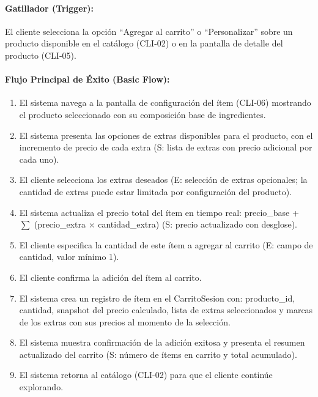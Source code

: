 \paragraph{Gatillador (Trigger):} El cliente selecciona la opción ``Agregar al carrito'' o ``Personalizar'' sobre un producto disponible en el catálogo (CLI-02) o en la pantalla de detalle del producto (CLI-05).

\paragraph{Flujo Principal de Éxito (Basic Flow):}
\begin{enumerate}
    \item[I.] El sistema navega a la pantalla de configuración del ítem (CLI-06) mostrando el producto seleccionado con su composición base de ingredientes.
    \item[II.] El sistema presenta las opciones de extras disponibles para el producto, con el incremento de precio de cada extra (S: lista de extras con precio adicional por cada uno).
    \item[III.] El cliente selecciona los extras deseados (E: selección de extras opcionales; la cantidad de extras puede estar limitada por configuración del producto).
    \item[IV.] El sistema actualiza el precio total del ítem en tiempo real: precio\_base + $\sum$ (precio\_extra $\times$ cantidad\_extra) (S: precio actualizado con desglose).
    \item[V.] El cliente especifica la cantidad de este ítem a agregar al carrito (E: campo de cantidad, valor mínimo 1).
    \item[VI.] El cliente confirma la adición del ítem al carrito.
    \item[VII.] El sistema crea un registro de ítem en el CarritoSesion con: producto\_id, cantidad, snapshot del precio calculado, lista de extras seleccionados y marcas de los extras con sus precios al momento de la selección.
    \item[VIII.] El sistema muestra confirmación de la adición exitosa y presenta el resumen actualizado del carrito (S: número de ítems en carrito y total acumulado).
    \item[IX.] El sistema retorna al catálogo (CLI-02) para que el cliente continúe explorando.
\end{enumerate}

